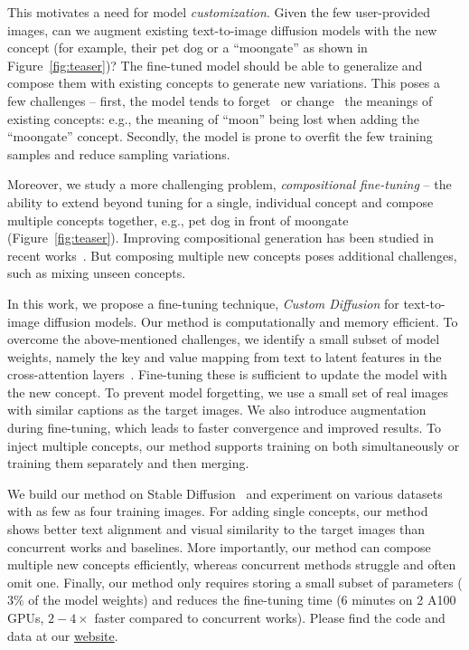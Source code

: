 This motivates a need for model \textit{customization}. Given the few user-provided images, can we augment existing text-to-image diffusion models with the new concept (for example, their pet dog or a ``moongate'' as shown in Figure~\ref{fig:teaser})? The fine-tuned model should be able to generalize and compose them with existing concepts to generate new variations. This poses a few challenges -- first, the model tends to forget~\cite{ding2022don,ramasesh2021effect,li2022overcoming} or change~\cite{lee2019countering,lu2020countering} the meanings of existing concepts: e.g., the meaning of ``moon'' being lost when adding the ``moongate'' concept. Secondly, the model is prone to overfit the few training samples and reduce sampling variations.

Moreover, we study a more challenging problem, \emph{compositional fine-tuning} -- the ability to extend beyond tuning for a single, individual concept and compose multiple concepts together, e.g., {\menlo pet dog in front of moongate} (Figure~\ref{fig:teaser}). Improving compositional generation has been studied in recent works~\cite{liu2022compositional}. But composing multiple new concepts poses additional challenges, such as mixing unseen concepts. 

In this work, we propose a fine-tuning technique, \textit{Custom Diffusion} for text-to-image diffusion models. Our method is computationally and memory efficient. To overcome the above-mentioned challenges, we identify a small subset of model weights, namely the key and value mapping from text to latent features in the cross-attention layers~\cite{vaswani2017attention,bahdanau2014neural}. Fine-tuning these is sufficient to update the model with the new concept. To prevent model forgetting, we use a small set of real images with similar captions as the target images. We also introduce augmentation during fine-tuning, which leads to faster convergence and improved results. To inject multiple concepts, our method supports training on both simultaneously or training them separately and then merging.

We build our method on Stable Diffusion~\cite{stablediffusionlink} and experiment on various datasets with as few as four training images. For adding single concepts, our method shows better text alignment and visual similarity to the target images than concurrent works and baselines. More importantly, our method can compose multiple new concepts efficiently, whereas concurrent methods struggle and often omit one. Finally, our method only requires storing a small subset of parameters ($3\%$ of the model weights) and reduces the fine-tuning time (6 minutes on 2 A100 GPUs, $2-4 \times$ faster compared to concurrent works). Please find the code and data at our \href{https://www.cs.cmu.edu/~custom-diffusion/} {website}.

